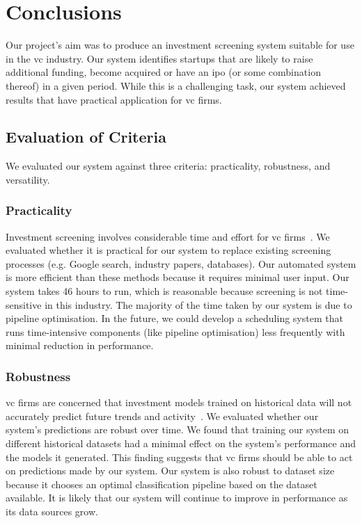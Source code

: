 \documentclass[../thesis/thesis.tex]{subfiles}
\begin{document}
 \chapter{Conclusions}
 \label{chap:conclusions}

Our project's aim was to produce an investment screening system suitable for use in the \gls{vc} industry. Our system identifies startups that are likely to raise additional funding, become acquired or have an \gls{ipo} (or some combination thereof) in a given period. While this is a challenging task, our system achieved results that have practical application for \gls{vc} firms.

\section{Evaluation of Criteria}

We evaluated our system against three criteria: practicality, robustness, and versatility.

\subsection{Practicality}

Investment screening involves considerable time and effort for \gls{vc} firms~\cite{fried1994}. We evaluated whether it is practical for our system to replace existing screening processes (e.g. Google search, industry papers, databases). Our automated system is more efficient than these methods because it requires minimal user input. Our system takes 46 hours to run, which is reasonable because screening is not time-sensitive in this industry. The majority of the time taken by our system is due to pipeline optimisation. In the future, we could develop a scheduling system that runs time-intensive components (like pipeline optimisation) less frequently with minimal reduction in performance.

\subsection{Robustness}

\Gls{vc} firms are concerned that investment models trained on historical data will not accurately predict future trends and activity~\cite{stone2014}. We evaluated whether our system's predictions are robust over time. We found that training our system on different historical datasets had a minimal effect on the system's performance and the models it generated. This finding suggests that \gls{vc} firms should be able to act on predictions made by our system. Our system is also robust to dataset size because it chooses an optimal classification pipeline based on the dataset available. It is likely that our system will continue to improve in performance as its data sources grow.
\end{document}
